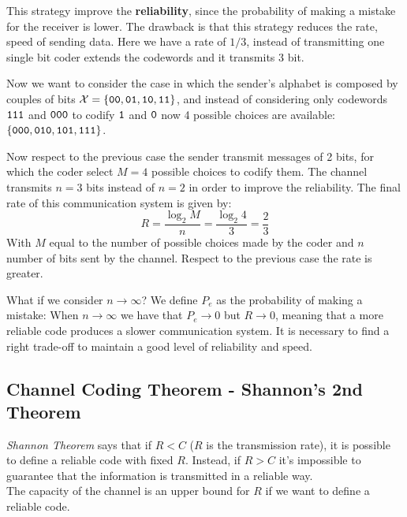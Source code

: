 This strategy improve the \textbf{reliability}, since the probability of making a mistake for the receiver is lower. The drawback is that this strategy reduces the rate, speed of sending data. Here we have a rate of $1/3$, instead of transmitting one single bit coder extends the codewords and it transmits 3 bit.


Now we want to consider the case in which the sender's alphabet is composed by couples of bits $\mathcal{X} = \{\verb|00|,\verb|01|,\verb|10|,\verb|11|\}$, and instead of considering only codewords $\verb|111|$ and $\verb|000|$ to codify $\verb|1|$ and $\verb|0|$ now 4 possible choices are available: $\{\verb|000|, \verb|010|, \verb|101|, \verb|111|\}$.

Now respect to the previous case the sender transmit messages of 2 bits, for which the coder select $M = 4$ possible choices to codify them. The channel transmits $n = 3$ bits instead of $n = 2$ in order to improve the reliability. The final rate of this communication system is given by:
$$R = \frac{\log_2 M}{n} = \frac{\log_2 4}{3} = \frac{2}{3}$$
With $M$ equal to the number of possible choices made by the coder and $n$ number of bits sent by the channel. Respect to the previous case the rate is greater.

What if we consider $n \rightarrow \infty$? We define $P_e$ as the probability of making a mistake:
When $n \rightarrow \infty$ we have that $P_e \rightarrow 0$ but $R \rightarrow 0$, meaning that a more reliable code produces a slower communication system.
It is necessary to find a right trade-off to maintain a good level of reliability and speed.
\subsection{Channel Coding Theorem - Shannon's 2nd Theorem}
\textit{Shannon Theorem} says that if $R < C$ ($R$ is the transmission rate), it is possible to define a reliable code with fixed $R$. Instead, if $R > C$ it's impossible to guarantee that the information is transmitted in a reliable way.\\
The capacity of the channel is an upper bound for $R$ if we want to define a reliable code.

